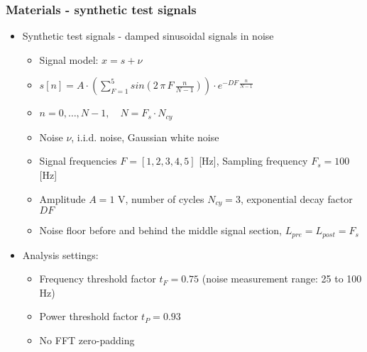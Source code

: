 \documentclass[11pt,aspectratio=169]{beamer}
\begin{document}
	\begin{frame}
		\frametitle{Materials - synthetic test signals}
		\begin{itemize}
			\item \textcolor{RIPtitlecol}{Synthetic test signals - damped sinusoidal signals in noise}
			\begin{itemize}
				\item Signal model: $x = s + \nu$
				\item $s[n] = A \cdot \left( \sum\limits_{F=1}^{5} sin(2\,\pi\,F\,\frac{n}{N-1}) \right) \cdot e^{-DF\,\frac{n}{N-1}}$
				\item $n = 0,\ldots,N-1, \quad N = F_s \cdot N_{cy}$
				\item Noise $\nu$, i.i.d. noise, Gaussian white noise
				\item Signal frequencies $F = [1, 2, 3, 4, 5]$ [Hz], Sampling frequency $F_s = 100$ [Hz]
				\item Amplitude $A = 1$ V, number of cycles $N_{cy} = 3$, exponential decay factor $DF$
				\item Noise floor before and behind the middle signal section, $L_{pre} = L_{post} = F_s$
			\end{itemize}
			\item \textcolor{RIPtitlecol}{Analysis settings:}
			\begin{itemize}
				\item Frequency threshold factor $t_F = 0.75$ (noise measurement range: 25 to 100 Hz)
				\item Power threshold factor $t_P = 0.93$
				\item No FFT zero-padding
			\end{itemize}
		\end{itemize}	
	\end{frame}
\end{document}
